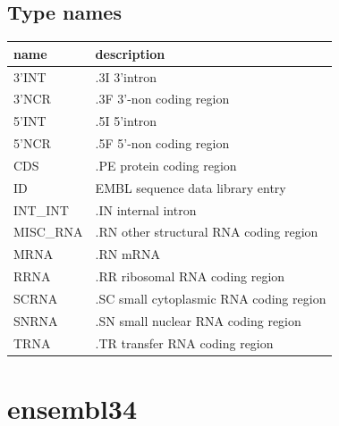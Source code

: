 \documentclass{article}
\begin{document}
\begin{Schunk}
\subsection{Type names}
\noindent\begin{tabular}{ll}
\hline \hline
name & description\\
\hline
3'INT & .3I 3'intron \\
3'NCR & .3F  3'-non coding region \\
5'INT & .5I 5'intron \\
5'NCR & .5F  5'-non coding region \\
CDS & .PE protein coding region \\
ID & EMBL sequence data library entry \\
INT\_INT & .IN  internal intron \\
MISC\_RNA & .RN other structural RNA coding region \\
MRNA & .RN mRNA \\
RRNA & .RR ribosomal RNA coding region \\
SCRNA & .SC small cytoplasmic RNA coding region \\
SNRNA & .SN small nuclear RNA coding region \\
TRNA & .TR transfer RNA coding region \\
\hline \hline
\end{tabular}

\section{ ensembl34 }

\end{Schunk}
\end{document}
